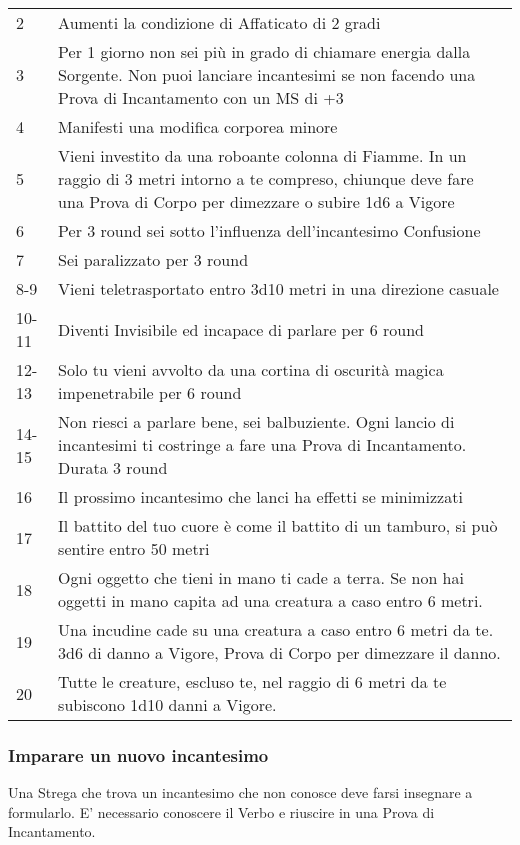 \documentclass[12pt,a4paper,twoside,openany]{book}
\begin{document}
\begin{multicols}{2}
\medskip
{\small
	\begin{tabularx}{0.45\textwidth}{lX}
		\hline
		2 & Aumenti la condizione di Affaticato di 2 gradi\\
		3 & Per 1 giorno non sei più in grado di chiamare energia dalla Sorgente. Non puoi lanciare incantesimi se non facendo una Prova di Incantamento con un MS di +3\\
		4 & Manifesti una modifica corporea minore\\
		5 & Vieni investito da una roboante colonna di Fiamme. In un raggio di 3 metri intorno a te compreso, chiunque deve fare una Prova di Corpo per dimezzare o subire 1d6 a Vigore\\
		6 & Per 3 round sei sotto l'influenza dell'incantesimo Confusione\\
		7 & Sei paralizzato per 3 round\\
		8-9 & Vieni teletrasportato entro 3d10 metri in una direzione casuale\\
		10-11 & Diventi Invisibile ed incapace di parlare per 6 round\\
		12-13 &  Solo tu vieni avvolto da una cortina di oscurità magica impenetrabile per 6 round\\
		14-15 & Non riesci a parlare bene, sei balbuziente. Ogni lancio di incantesimi ti costringe a fare una Prova di Incantamento. Durata 3 round\\
		16 & Il prossimo incantesimo che lanci ha effetti se minimizzati\\
		17 & Il battito del tuo cuore è come il battito di un tamburo, si può sentire entro 50 metri\\
		18 & Ogni oggetto che tieni in mano ti cade a terra. Se non hai oggetti in mano capita ad una creatura a caso entro 6 metri.\\
		19 & Una incudine cade su una creatura a caso entro 6 metri da te. 3d6 di danno a Vigore, Prova di Corpo per dimezzare il danno.\\
		20 & Tutte le creature, escluso te, nel raggio di 6 metri da te subiscono 1d10 danni a Vigore.
\end{tabularx}}

\subsubsection{Imparare un nuovo incantesimo}

Una Strega che trova un incantesimo che non conosce deve farsi insegnare a formularlo. E' necessario conoscere il Verbo e riuscire in una Prova di Incantamento.


\end{multicols}
\end{document}
